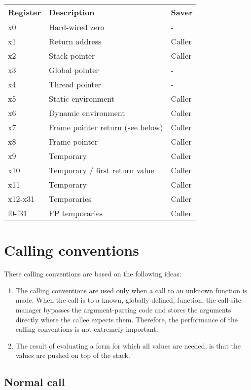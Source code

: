 {\small
\begin{tabular}{|l|l|l|}
  \hline
  Register & Description & Saver\\
  \hline
  \hline
  x0 & Hard-wired zero & -\\
  x1 & Return address & Caller\\
  x2 & Stack pointer & Caller\\
  x3 & Global pointer & -\\
  x4 & Thread pointer & -\\
  x5 & Static environment & Caller\\
  x6 & Dynamic environment & Caller\\
  x7 & Frame pointer return (see below) & Caller\\
  x8 & Frame pointer & Caller\\
  x9 & Temporary & Caller\\
  x10 & Temporary / first return value & Caller\\
  x11 & Temporary & Caller\\
  x12-x31 & Temporaries & Caller\\
  \hline
  f0-f31 & FP temporaries & Caller\\
  \hline
\end{tabular}}

\section{Calling conventions}
\label{sec-backend-risc-v-calling-conventions}

These calling conventions are based on the following ideas:

\begin{enumerate}
\item The calling conventions are used only when a call to an unknown
  function is made.  When the call is to a known, globally defined,
  function, the call-site manager bypasses the argument-parsing code
  and stores the arguments directly where the callee expects them.
  Therefore, the performance of the calling conventions is not
  extremely important.
\item The result of evaluating a form for which all values are needed,
  is that the values are pushed on top of the stack.
\end{enumerate}

\subsection{Normal call}

